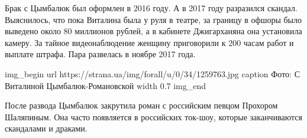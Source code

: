 Брак с Цымбалюк был оформлен в 2016 году. А в 2017 году разразился скандал.
Выяснилось, что пока Виталина была у руля в театре, за границу в офшоры было
выведено около 80 миллионов рублей, а в кабинете Джигарханяна она установила
камеру. За тайное видеонаблюдение женщину приговорили к 200 часам работ и
выплате штрафа. Пара развелась в ноябре 2017 года.

\ifcmt
img_begin 
	url https://strana.ua/img/forall/u/0/34/1259763.jpg
  caption Фото: С Виталиной Цымбалюк-Романовской
	width 0.7
img_end
\fi

После развода Цымбалюк закрутила роман с российским певцом Прохором
Шаляпиным. Она часто появляется в российских ток-шоу, которые
заканчиваются скандалами и драками.

